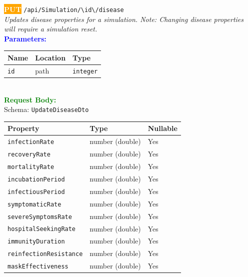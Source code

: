 \begin{tcolorbox}[
    colback=orange!5,
    colframe=orange,
    arc=2mm,
    boxrule=1pt,
    left=5pt,
    right=5pt,
    top=5pt,
    bottom=5pt
]
\noindent\colorbox{orange}{\textcolor{white}{\textbf{PUT}}} 
\texttt{\large /api/Simulation/\textbackslash{}{id\textbackslash{}}/disease}\\[0.3em]
\textit{Updates disease properties for a simulation.
Note: Changing disease properties will require a simulation reset.}\\[0.3em]
\vspace{0.3em}
\textbf{\textcolor{blue}{Parameters:}}\\[0.2em]
\begin{tabular}{|l|l|l|}
\hline
\rowcolor{gray!20}
\textbf{Name} & \textbf{Location} & \textbf{Type} \\ \hline
\texttt{id} & path & \texttt{integer} \\ \hline
\end{tabular}\\[0.5em]
\vspace{0.3em}
\textbf{\textcolor{green}{Request Body:}}\\[0.2em]
Schema: \texttt{UpdateDiseaseDto}\\[0.3em]
\begin{tabular}{|l|l|l|}
\hline
\rowcolor{green!10}
\textbf{Property} & \textbf{Type} & \textbf{Nullable} \\ \hline
\texttt{infectionRate} & number (double) & Yes \\ \hline
\rowcolor{gray!5}
\texttt{recoveryRate} & number (double) & Yes \\ \hline
\texttt{mortalityRate} & number (double) & Yes \\ \hline
\rowcolor{gray!5}
\texttt{incubationPeriod} & number (double) & Yes \\ \hline
\texttt{infectiousPeriod} & number (double) & Yes \\ \hline
\rowcolor{gray!5}
\texttt{symptomaticRate} & number (double) & Yes \\ \hline
\texttt{severeSymptomsRate} & number (double) & Yes \\ \hline
\rowcolor{gray!5}
\texttt{hospitalSeekingRate} & number (double) & Yes \\ \hline
\texttt{immunityDuration} & number (double) & Yes \\ \hline
\rowcolor{gray!5}
\texttt{reinfectionResistance} & number (double) & Yes \\ \hline
\texttt{maskEffectiveness} & number (double) & Yes \\ \hline

\end{tabular}
\end{tcolorbox}
